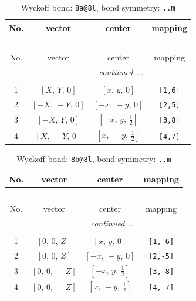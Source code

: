 \documentclass[fleqn,8pt]{jsarticle}
\begin{document}
\begin{longtable}{cccc}
\caption{Wyckoff bond: {\tt 8a@8l}, bond symmetry: {\tt ..m}}
 \\
 \hline \hline
No. & vector & center & mapping \\ \hline \endfirsthead

\multicolumn{3}{l}{\tablename\ \thetable{}} \\
 \hline \hline
No. & vector & center & mapping \\ \hline \endhead

 \hline \hline
\multicolumn{3}{r}{\footnotesize\it continued ...} \\ \endfoot

 \hline \hline
\multicolumn{3}{r}{} \\ \endlastfoot

1 & $\left[ X,\, Y,\, 0 \right]$ & $\left[ x,\, y,\, 0 \right]$ & {\tt [1,6]} \\ \hline
2 & $\left[ - X,\, - Y,\, 0 \right]$ & $\left[ - x,\, - y,\, 0 \right]$ & {\tt [2,5]} \\ \hline
3 & $\left[ - X,\, Y,\, 0 \right]$ & $\left[ - x,\, y,\, \frac{1}{2} \right]$ & {\tt [3,8]} \\ \hline
4 & $\left[ X,\, - Y,\, 0 \right]$ & $\left[ x,\, - y,\, \frac{1}{2} \right]$ & {\tt [4,7]} \\
\end{longtable}
\renewcommand{\arraystretch}{1.2}
\begin{longtable}{cccc}
\caption{Wyckoff bond: {\tt 8b@8l}, bond symmetry: {\tt ..m}}
 \\
 \hline \hline
No. & vector & center & mapping \\ \hline \endfirsthead

\multicolumn{3}{l}{\tablename\ \thetable{}} \\
 \hline \hline
No. & vector & center & mapping \\ \hline \endhead

 \hline \hline
\multicolumn{3}{r}{\footnotesize\it continued ...} \\ \endfoot

 \hline \hline
\multicolumn{3}{r}{} \\ \endlastfoot

1 & $\left[ 0,\, 0,\, Z \right]$ & $\left[ x,\, y,\, 0 \right]$ & {\tt [1,-6]} \\ \hline
2 & $\left[ 0,\, 0,\, Z \right]$ & $\left[ - x,\, - y,\, 0 \right]$ & {\tt [2,-5]} \\ \hline
3 & $\left[ 0,\, 0,\, - Z \right]$ & $\left[ - x,\, y,\, \frac{1}{2} \right]$ & {\tt [3,-8]} \\ \hline
4 & $\left[ 0,\, 0,\, - Z \right]$ & $\left[ x,\, - y,\, \frac{1}{2} \right]$ & {\tt [4,-7]} \\
\end{longtable}
\end{document}
